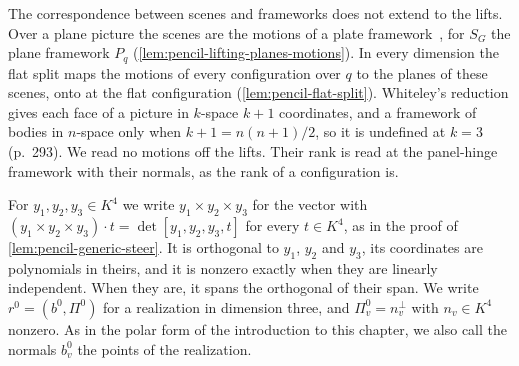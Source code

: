 The correspondence between scenes and frameworks does not extend to the
lifts. Over a plane picture the scenes are the motions of a plate
framework~\cite[Proposition~4.1]{whiteley1984}, for $S_G$ the plane
framework $P_q$ (\cref{lem:pencil-lifting-planes-motions}). In every
dimension the flat split maps the motions of every configuration over
$q$ to the planes of these scenes, onto at the flat configuration
(\cref{lem:pencil-flat-split}). Whiteley's reduction gives each face of
a picture in $k$-space $k + 1$ coordinates, and a framework of bodies in
$n$-space only when $k + 1 = n(n + 1)/2$, so it is undefined at $k = 3$
(p.~293). We read no motions off the lifts. Their rank is read at the
panel-hinge framework with their normals, as the rank of a configuration
is.

For $y_1, y_2, y_3 \in K^4$ we write $y_1 \times y_2 \times y_3$ for the
vector with $(y_1 \times y_2 \times y_3) \cdot t = \det[y_1, y_2, y_3, t]$
for every $t \in K^4$, as in the proof of \cref{lem:pencil-generic-steer}.
It is orthogonal to $y_1$, $y_2$ and $y_3$, its coordinates are
polynomials in theirs, and it is nonzero exactly when they are linearly
independent. When they are, it spans the orthogonal of their span. We
write $r^0 = (b^0, \Pi^0)$ for a realization in dimension three, and
$\Pi^0_v = n_v^{\perp}$ with $n_v \in K^4$ nonzero. As in the polar form
of the introduction to this chapter, we also call the normals $b^0_v$
the points of the realization.

